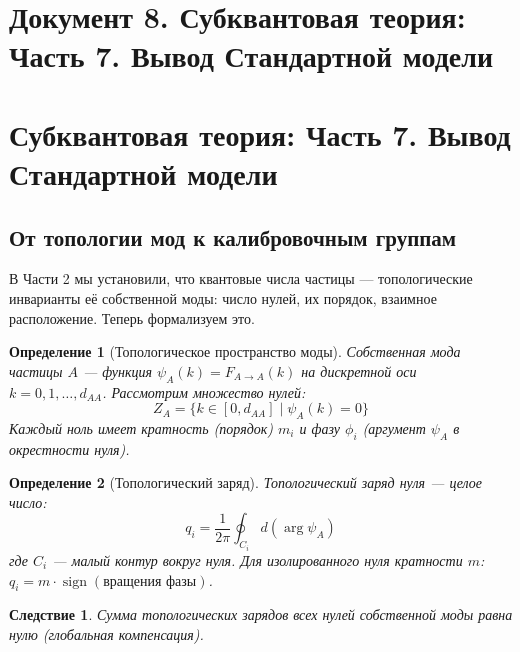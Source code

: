 \documentclass[12pt,a4paper]{article}
\newtheorem{definition}{Определение}[section]
\newtheorem{corollary}{Следствие}[section]
\begin{document}
\newpage
\section*{Документ 8. Субквантовая теория: Часть 7. Вывод Стандартной модели}

\section{Субквантовая теория: Часть 7. Вывод Стандартной модели}

\subsection{От топологии мод к калибровочным группам}

В Части 2 мы установили, что квантовые числа частицы — топологические инварианты её собственной моды: число нулей, их порядок, взаимное расположение. Теперь формализуем это.

\begin{definition}[Топологическое пространство моды]
Собственная мода частицы $A$ — функция $\psi_A(k) = F_{A \to A}(k)$ на дискретной оси $k = 0, 1, \dots, d_{AA}$. Рассмотрим множество нулей:
\begin{equation}
    Z_A = \{k \in [0, d_{AA}] \mid \psi_A(k) = 0\}
\end{equation}
Каждый ноль имеет кратность (порядок) $m_i$ и фазу $\phi_i$ (аргумент $\psi_A$ в окрестности нуля).
\end{definition}

\begin{definition}[Топологический заряд]
Топологический заряд нуля — целое число:
\begin{equation}
    q_i = \frac{1}{2\pi} \oint_{C_i} d(\arg \psi_A)
\end{equation}
где $C_i$ — малый контур вокруг нуля. Для изолированного нуля кратности $m$: $q_i = m \cdot \operatorname{sign}(\text{вращения фазы})$.
\end{definition}

\begin{corollary}
Сумма топологических зарядов всех нулей собственной моды равна нулю (глобальная компенсация).
\end{corollary}
\end{document}
